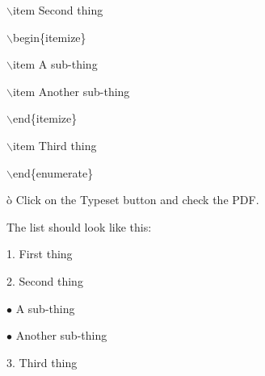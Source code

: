 \documentclass[a4paper,portrait,12pt]{article}
\begin{document}
\begin{flushleft}
\ensuremath{\backslash}item Second thing
\end{flushleft}


\begin{flushleft}
\ensuremath{\backslash}begin\{itemize\}
\end{flushleft}


\begin{flushleft}
\ensuremath{\backslash}item A sub-thing
\end{flushleft}


\begin{flushleft}
\ensuremath{\backslash}item Another sub-thing
\end{flushleft}


\begin{flushleft}
\ensuremath{\backslash}end\{itemize\}
\end{flushleft}


\begin{flushleft}
\ensuremath{\backslash}item Third thing
\end{flushleft}


\begin{flushleft}
\ensuremath{\backslash}end\{enumerate\}
\end{flushleft}


\begin{flushleft}
\`{o} Click on the Typeset button and check the PDF.
\end{flushleft}


\begin{flushleft}
The list should look like this:
\end{flushleft}


\begin{flushleft}
1. First thing
\end{flushleft}


\begin{flushleft}
2. Second thing
\end{flushleft}


\begin{flushleft}
$\bullet$ A sub-thing
\end{flushleft}


\begin{flushleft}
$\bullet$ Another sub-thing
\end{flushleft}


\begin{flushleft}
3. Third thing
\end{flushleft}
\end{document}
